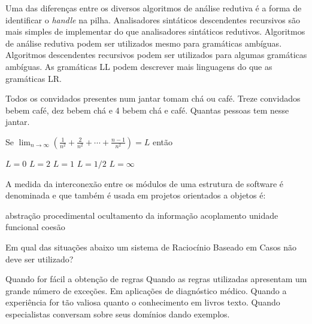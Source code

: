 \documentclass[12pt, addpoints]{exam}
\begin{document}
\begin{questions}
\begin{choices}
\choice Uma das diferenças entre os diversos algoritmos de análise redutiva é a forma de identificar o \textit{handle} na pilha.
\choice Analisadores sintáticos descendentes recursivos são mais simples de implementar do que analisadores sintáticos redutivos.
\choice Algoritmos de análise redutiva podem ser utilizados mesmo para gramáticas ambíguas.
\choice Algoritmos descendentes recursivos podem ser utilizados para algumas gramáticas ambíguas.
\choice As gramáticas LL podem descrever mais linguagens do que as gramáticas LR.
\end{choices}

\question

Todos os convidados presentes num jantar tomam chá ou café. Treze convidados bebem café, dez bebem chá e 4 bebem chá e café. Quantas pessoas tem nesse jantar.


\begin{choices}
\end{choices}

\question

Se \( \lim_{n \to \infty} \left( \frac{1}{n^2} + \frac{2}{n^2} + \cdots + \frac{n-1}{n^2} \right) = L \) então


\begin{choices}
\choice \( L = 0 \)
\choice \( L = 2 \)
\choice \( L = 1 \)
\choice \( L = 1/2 \)
\choice \( L = \infty \)
\end{choices}

\question

A medida da interconexão entre os módulos de uma estrutura de software é denominada e que também é usada em projetos orientados a objetos é: 
\begin{choices}
\choice abstração procedimental
\choice ocultamento da informação
\choice acoplamento
\choice unidade funcional
\choice coesão
\end{choices}

\question

Em qual das situações abaixo um sistema de Raciocínio Baseado em Casos não deve ser utilizado?


\begin{choices}
\choice Quando for fácil a obtenção de regras
\choice Quando as regras utilizadas apresentam um grande número de exceções.
\choice Em aplicações de diagnóstico médico.
\choice Quando a experiência for tão valiosa quanto o conhecimento em livros texto.
\choice Quando especialistas conversam sobre seus domínios dando exemplos.
\end{choices}



    \end{questions}
    
\end{document}
